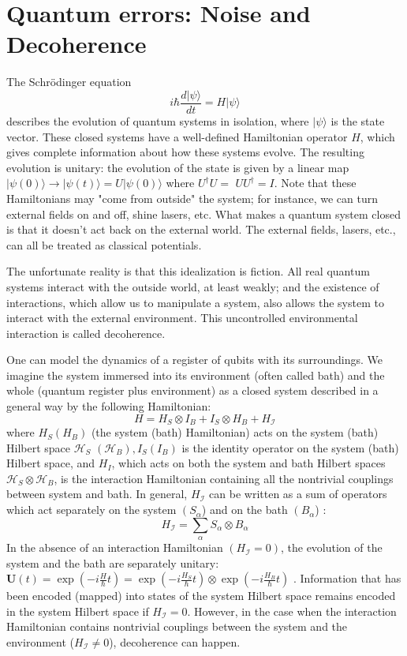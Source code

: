 \section{Quantum errors: Noise and Decoherence}
The Schrödinger equation
$$
i \hbar \frac{d|\psi\rangle}{d t}=H|\psi\rangle
$$
describes the evolution of quantum systems in isolation, where $|\psi\rangle$ is the state vector. These closed systems have a well-defined Hamiltonian operator $H$, which gives complete information about how these systems evolve. The resulting evolution is unitary: the evolution of the state is given by a linear map $|\psi(0)\rangle \rightarrow|\psi(t)\rangle=U|\psi(0)\rangle$ where $U^{\dagger} U=$ $U U^{\dagger}=I$. Note that these Hamiltonians may "come from outside" the system; for instance, we can turn external fields on and off, shine lasers, etc. What makes a quantum system closed is that it doesn't act back on the external world. The external fields, lasers, etc., can all be treated as classical potentials.

The unfortunate reality is that this idealization is fiction. All real quantum systems interact with the outside world, at least weakly; and the existence of interactions, which allow us to manipulate a system, also allows the system to interact with the external environment. This uncontrolled environmental interaction is called decoherence.

One can model the dynamics of a register of qubits with its surroundings. We imagine the system immersed into its environment (often called bath) and the whole (quantum register plus environment) as a closed system described in a general way by the following Hamiltonian:
$$
H=H_{S} \otimes I_{B}+I_{S} \otimes H_{B}+H_{\mathcal{I}}
$$
where $H_{S}\left(H_{B}\right)$ (the system (bath) Hamiltonian) acts on the system (bath) Hilbert space $\mathcal{H}_{S}$ $\left(\mathcal{H}_{B}\right), I_{S}\left(I_{B}\right)$ is the identity operator on the system (bath) Hilbert space, and $H_{I}$, which acts on both the system and bath Hilbert spaces $\mathcal{H}_{S} \otimes \mathcal{H}_{B}$, is the interaction Hamiltonian containing all the nontrivial couplings between system and bath. In general, $H_{\mathcal{I}}$ can be written as a sum of operators which act separately on the system $\left(S_{\alpha}\right.$) and on the bath $\left(B_{\alpha}\right.$) \cite{kempe2006approaches}:
$$
H_{\mathcal{I}}=\sum_{\alpha} S_{\alpha} \otimes B_{\alpha}
$$
In the absence of an interaction Hamiltonian $\left(H_{\mathcal{I}}=0\right)$, the evolution of the system and the bath are separately unitary: $\mathbf{U}(t)=\exp (-i \frac{H}{\hbar} t)=\exp \left(-i \frac{H_{S}}{\hbar} t\right) \otimes \exp \left(-i \frac{H_{B}}{\hbar} t\right)$ . Information that has been encoded (mapped) into states of the system Hilbert space remains encoded in the system Hilbert space if $H_{\mathcal{I}}=0$.
 However, in the case when the interaction Hamiltonian contains nontrivial couplings between the system and the environment ($H_{\mathcal{I}}\neq 0$), decoherence can happen. %

